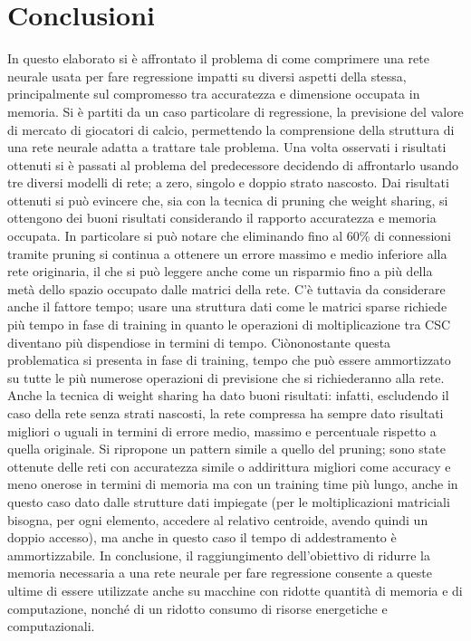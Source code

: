 \documentclass[12pt]{report}
\begin{document}
\par\null\par
\par\null\par
\par\null\par



\chapter*{Conclusioni}
In questo elaborato si è affrontato il problema di come comprimere una rete neurale usata per fare regressione impatti su diversi aspetti della stessa, principalmente sul compromesso tra accuratezza e dimensione occupata in memoria. Si è partiti da un caso particolare di regressione, la previsione del valore di mercato di giocatori di calcio, permettendo la comprensione della struttura di una rete neurale adatta a trattare tale problema. Una volta osservati i risultati ottenuti si è passati al problema del predecessore decidendo di affrontarlo usando tre diversi modelli di rete; a zero, singolo e doppio strato nascosto. Dai risultati ottenuti si può evincere che, sia con la tecnica di pruning che weight sharing, si ottengono dei buoni risultati considerando il rapporto accuratezza e memoria occupata. In particolare si può notare che eliminando fino al 60\% di connessioni tramite pruning si continua a ottenere un errore massimo e medio inferiore alla rete originaria, il che si può leggere anche come un risparmio fino a più della metà dello spazio occupato dalle matrici della rete. C'è tuttavia da considerare anche il fattore tempo; usare una struttura dati come le matrici sparse richiede più tempo in fase di training in quanto le operazioni di moltiplicazione tra CSC diventano più dispendiose in termini di tempo. Ciònonostante questa problematica si presenta in fase di training, tempo che può essere ammortizzato su tutte le più numerose operazioni di previsione che si richiederanno alla rete.
Anche la tecnica di weight sharing ha dato buoni risultati: infatti, escludendo il caso della rete senza strati nascosti, la rete compressa ha sempre dato risultati migliori o uguali in termini di errore medio, massimo e percentuale rispetto a quella originale. Si ripropone un pattern simile a quello del pruning; sono state ottenute delle reti con accuratezza simile o addirittura migliori come accuracy e meno onerose in termini di memoria ma con un training time più lungo, anche in questo caso dato dalle strutture dati impiegate (per le moltiplicazioni matriciali bisogna, per ogni elemento, accedere al relativo centroide, avendo quindi un doppio accesso), ma anche in questo caso il tempo di addestramento è ammortizzabile.
In conclusione, il raggiungimento dell'obiettivo di ridurre la memoria necessaria a una rete neurale per fare regressione consente a queste ultime di essere utilizzate anche su macchine con ridotte quantità di memoria e di computazione, nonché di un ridotto consumo di risorse energetiche e computazionali. 

{}

\end{document}
